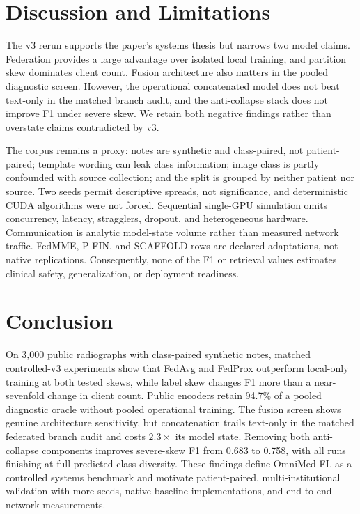 \section{Discussion and Limitations}

The v3 rerun supports the paper's systems thesis but narrows two model claims.
Federation provides a large advantage over isolated local training, and
partition skew dominates client count. Fusion architecture also matters in
the pooled diagnostic screen. However, the operational concatenated model
does not beat text-only in the matched branch audit, and the anti-collapse
stack does not improve F1 under severe skew. We retain both negative findings
rather than overstate claims contradicted by v3.

The corpus remains a proxy: notes are synthetic and class-paired, not
patient-paired; template wording can leak class information; image class is
partly confounded with source collection; and the split is grouped by neither
patient nor source. Two seeds permit descriptive spreads, not significance,
and deterministic CUDA algorithms were not forced. Sequential single-GPU
simulation omits concurrency, latency, stragglers, dropout, and heterogeneous
hardware. Communication is analytic model-state volume rather than measured
network traffic. FedMME, P-FIN, and SCAFFOLD rows are declared adaptations,
not native replications. Consequently, none of the F1 or retrieval values
estimates clinical safety, generalization, or deployment readiness.

\newpage
\section{Conclusion}

On 3,000 public radiographs with class-paired synthetic notes, matched
controlled-v3 experiments show that FedAvg and FedProx outperform local-only
training at both tested skews, while label skew changes F1 more than a
near-sevenfold change in client count. Public encoders retain 94.7\% of a
pooled diagnostic oracle without pooled operational training. The fusion
screen shows genuine architecture sensitivity, but concatenation trails
text-only in the matched federated branch audit and costs $2.3\times$ its
model state. Removing both anti-collapse components improves severe-skew F1
from 0.683 to 0.758, with all runs finishing at full predicted-class
diversity. These findings define OmniMed-FL as a controlled systems benchmark
and motivate patient-paired, multi-institutional validation with more seeds,
native baseline implementations, and end-to-end network measurements.
